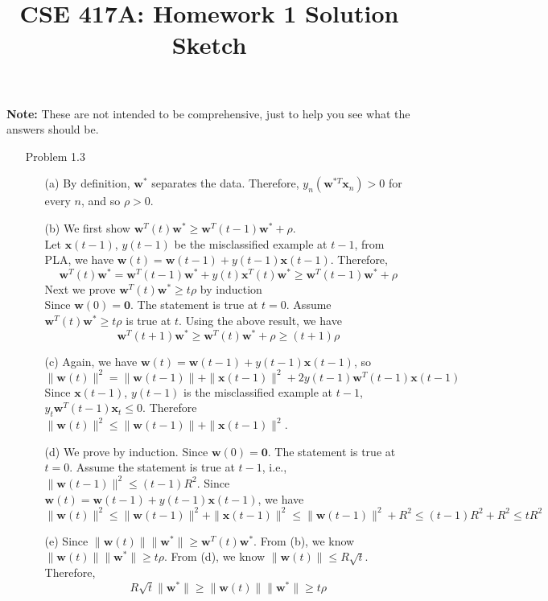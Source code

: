 \documentclass[10pt]{article}
\begin{document}
\title{CSE 417A: Homework 1 Solution Sketch}


\maketitle

\noindent \textbf{Note:} These are not intended to be comprehensive,
just to help you see what the answers should be.

\begin{enumerate}

\item[Problem 1.3]
\begin{itemize}
    \item[(a)] By definition, $\bm{w}^*$ separates the data. Therefore, $y_n(\bm{w}^{*T}\bm{x}_n) > 0$ for every $n$, and so $\rho>0$.
    \item[(b)] We first show $\bm{w}^T(t)\bm{w}^* \geq \bm{w}^T(t-1)\bm{w}^*+\rho$.\\
    Let $\bm{x}(t-1)$, $y(t-1)$ be the misclassified example at $t-1$, 
    from PLA, we have $\bm{w}(t)=\bm{w}(t-1) + y(t-1)\bm{x}(t-1)$.
    Therefore,
    \[
        \bm{w}^T(t)\bm{w}^* = \bm{w}^T(t-1)\bm{w}^* + y(t)\bm{x}^T(t)\bm{w}^* \geq \bm{w}^T(t-1)\bm{w}^* + \rho
    \]
    Next we prove $\bm{w}^T(t)\bm{w}^* \geq t \rho$ by induction\\
    Since $\bm{w}(0) = \bm{0}$. The statement is true at $t=0$.
    Assume $\bm{w}^T(t)\bm{w}^* \geq t \rho$ is true at $t$. Using the above result, we have 
    \[
        \bm{w}^T(t+1)\bm{w}^* \geq \bm{w}^T(t)\bm{w}^* + \rho \geq (t+1)\rho
    \]
    \item[(c)] Again, we have $\bm{w}(t)=\bm{w}(t-1) + y(t-1)\bm{x}(t-1)$, so
    \[
        \|\bm{w}(t)\|^2 = \|\bm{w}(t-1)\|+\|\bm{x}(t-1)\|^2 + 2y(t-1)\bm{w}^T(t-1)\bm{x}(t-1)
    \]
    Since $\bm{x}(t-1)$, $y(t-1)$ is the misclassified example at $t-1$, $y_t\bm{w}^T(t-1)\bm{x}_t\leq0$. 
    Therefore $\|\bm{w}(t)\|^2 \leq \|\bm{w}(t-1)\|+\|\bm{x}(t-1)\|^2$.
    \item[(d)] 
    We prove by induction.
    Since $\bm{w}(0) = \bm{0}$. The statement is true at $t=0$.
    Assume the statement is true at $t-1$, i.e., $\|\bm{w}(t-1)\|^2 \leq (t-1)R^2$. 
    Since $\bm{w}(t)=\bm{w}(t-1) + y(t-1)\bm{x}(t-1)$,
    we have 
    \[
        \|\bm{w}(t)\|^2 \leq \|\bm{w}(t-1)\|^2 + \|\bm{x}(t-1)\|^2 \leq \|\bm{w}(t-1)\|^2 + R^2 \leq (t-1)R^2  + R^2 \leq tR^2
    \]
    \item[(e)] Since $\|\bm{w}(t)\|\|\bm{w}^*\| \geq \bm{w}^T(t)\bm{w}^*$. 
    From (b), we know $\|\bm{w}(t)\|\|\bm{w}^*\| \geq t\rho$.
    From (d), we know $\|\bm{w}(t)\| \leq R\sqrt{t}$. Therefore,
    \[
        R\sqrt{t} \|\bm{w}^*\| \geq \|\bm{w}(t)\|\|\bm{w}^*\|\geq t\rho
    \]
\end{itemize}


\end{enumerate}
\end{document}
